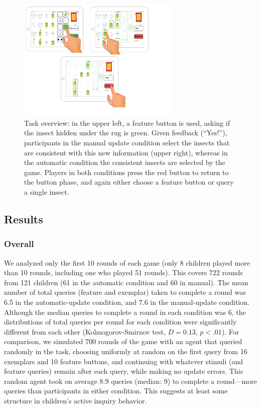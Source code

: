 \documentclass[man,floatsintext]{apa6}
\begin{document}
\begin{figure}[!h]
  \centering
  \includegraphics[width=0.7\textwidth]{figures/task_overview}
  \caption{Task overview: in the upper left, a feature button is used, asking if the insect 
hidden under the rug is green. Given feedback (``Yes!''), participants in the manual 
update condition select the insects that are consistent with this new information (upper 
right), whereas in the automatic condition the consistent insects are selected by the 
game. Players in both conditions press the red button to return to the button phase, 
and again either choose a feature button or query a single insect.}
  \label{fig:task-overview}
\end{figure} 


\subsection{Results}

\subsubsection{Overall}

We analyzed only the first 10 rounds of each game (only 8 children played more than 
10 rounds, including one who played 51 rounds). This covers 722 rounds from 121 
children (61 in the automatic condition and 60 in manual). The mean number of total queries (feature and exemplar) taken to complete a round was 6.5 in the automatic-update condition, and 7.6 in the manual-update condition. Although the median queries to complete a round in each condition was 6, the distributions of total queries per round for each condition were significantly different from each other (Kolmogorov-Smirnov test, $D = 0.13$, $p<.01$). 
For comparison, we simulated 700 rounds of the game with an agent that queried randomly in the task, 
choosing uniformly at random on the first query from 16 exemplars and 10 feature buttons, and continuing with whatever stimuli (and feature queries) remain after each query, while making no update errors. This random agent took on average 8.9 queries (median: 9) to complete a round---more queries than participants in either condition.
This suggests at least some structure in children's active inquiry behavior.
\end{document}
